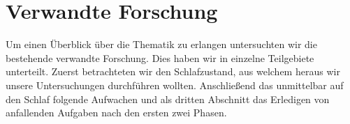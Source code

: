 \chapter{Verwandte Forschung}\label{sec:relatedWork}
Um einen Überblick über die Thematik zu erlangen untersuchten wir die bestehende verwandte Forschung. Dies haben wir in einzelne Teilgebiete unterteilt. Zuerst betrachteten wir den Schlafzustand, aus welchem heraus wir unsere Untersuchungen durchführen wollten. Anschließend das unmittelbar auf den Schlaf folgende Aufwachen und als dritten Abschnitt das Erledigen von anfallenden Aufgaben nach den ersten zwei Phasen.


